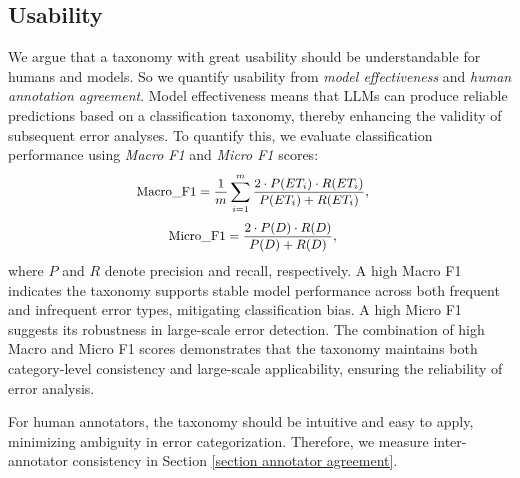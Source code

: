 \subsection{Usability}
We argue that a taxonomy with great usability should be understandable for humans and models. So we quantify usability from \textit{model effectiveness} and \textit{human annotation agreement}. Model effectiveness means that LLMs can produce reliable predictions based on a classification taxonomy, thereby enhancing the validity of subsequent error analyses. To quantify this, we evaluate classification performance using \textit{Macro F1} and \textit{Micro F1} scores:
\begin{equation}\begin{small}\begin{aligned} 
\operatorname{Macro\_F1} &= \frac{1}{m}\sum_{i=1}^m \frac{2 \cdot P(ET_i)\cdot R(ET_i)}{P(ET_i)+R(ET_i)},
\end{aligned}\end{small}\end{equation}
\begin{equation}\begin{small}\begin{aligned}
\operatorname{Micro\_F1} &= \frac{2 \cdot P(D)\cdot R(D)}{P(D)+R(D)},
\end{aligned}\end{small}\end{equation}
\noindent where $P$ and $R$ denote precision and recall, respectively. A high Macro F1 indicates the taxonomy supports stable model performance across both frequent and infrequent error types, mitigating classification bias. A high Micro F1 suggests its robustness in large-scale error detection. The combination of high Macro and Micro F1 scores demonstrates that the taxonomy maintains both category-level consistency and large-scale applicability, ensuring the reliability of error analysis.

For human annotators, the taxonomy should be intuitive and easy to apply, minimizing ambiguity in error categorization. Therefore, we measure inter-annotator consistency in Section \ref{section annotator agreement}.
